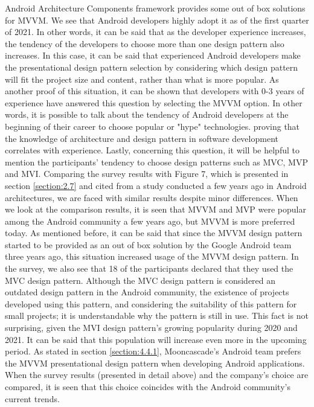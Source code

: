 Android Architecture Components framework provides some out of box solutions for MVVM. We see that Android developers highly adopt it as of the first quarter of 2021. 
In other words,  it can be said that as the developer experience increases, the tendency of the developers to choose more than one design pattern also increases. In this case, it can be said that experienced Android developers make the presentational design pattern selection by considering which design pattern will fit the project size and content, rather than what is more popular. As another proof of this situation, it can be shown that developers with 0-3 years of experience have answered this question by selecting the MVVM option. In other words, it is possible to talk about the tendency of Android developers at the beginning of their career to choose popular or "hype" technologies. proving that the knowledge of architecture and design pattern in software development correlates with experience. Lastly, concerning this question, it will be helpful to mention the participants’ tendency to choose design patterns such as MVC, MVP and MVI. Comparing the survey results with Figure 7, which is presented in section \ref{section:2.7} and cited from a study conducted a few years ago in Android architectures, we are faced with similar results despite minor differences. When we look at the comparison results, it is seen that MVVM and MVP were popular among the Android community a few years ago, but MVVM is more preferred today. As mentioned before, it can be said that since the MVVM design pattern started to be provided as an out of box solution by the Google Android team three years ago, this situation increased usage of the MVVM design pattern. In the survey, we also see that 18 of the participants declared that they used the MVC design pattern. Although the MVC design pattern is considered an outdated design pattern in the Android community, the existence of projects developed using this pattern, and considering the suitability of this pattern for small projects; it is understandable why the pattern is still in use. This fact is not surprising, given the MVI design pattern’s growing popularity during 2020 and 2021. It can be said that this population will increase even more in the upcoming period. As stated in section \ref{section:4.4.1}, Mooncascade's Android team prefers the MVVM presentational design pattern when developing Android applications. When the survey results (presented in detail above) and the company's choice are compared, it is seen that this choice coincides with the Android community’s current trends.

